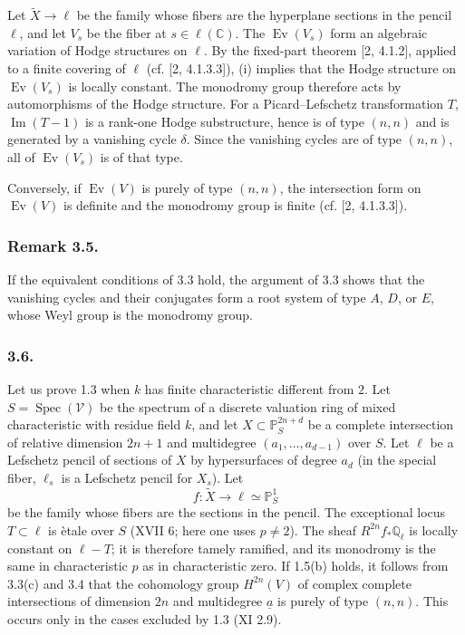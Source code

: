 Let $\widetilde X\to\ell$ be the family whose fibers are the hyperplane
sections in the pencil $\ell$, and let $V_s$ be the fiber at
$s\in\ell(\mathbb C)$.  The $\operatorname{Ev}(V_s)$ form an algebraic
variation of Hodge structures on $\ell$.  By the fixed-part theorem
[2, 4.1.2], applied to a finite covering of $\ell$ (cf. [2, 4.1.3.3]), (i)
implies that the Hodge structure on $\operatorname{Ev}(V_s)$ is locally
constant.  The monodromy group therefore acts by automorphisms of the Hodge
structure.  For a Picard--Lefschetz transformation $T$,
$\operatorname{Im}(T-1)$ is a rank-one Hodge substructure, hence is of type
$(n,n)$ and is generated by a vanishing cycle $\delta$.  Since the
vanishing cycles are of type $(n,n)$, all of
$\operatorname{Ev}(V_s)$ is of that type.

Conversely, if $\operatorname{Ev}(V)$ is purely of type $(n,n)$, the
intersection form on $\operatorname{Ev}(V)$ is definite and the monodromy
group is finite (cf. [2, 4.1.3.3]).

\subsubsection*{Remark 3.5.}
If the equivalent conditions of 3.3 hold, the argument of 3.3 shows that
the vanishing cycles and their conjugates form a root system of type $A$,
$D$, or $E$, whose Weyl group is the monodromy group.

\subsubsection*{3.6.}
Let us prove 1.3 when $k$ has finite characteristic different from $2$.
Let $S=\operatorname{Spec}(\mathcal V)$ be the spectrum of a discrete
valuation ring of mixed characteristic with residue field $k$, and let
$X\subset\mathbb P_S^{2n+d}$ be a complete intersection of relative
dimension $2n+1$ and multidegree $(a_1,\ldots,a_{d-1})$ over $S$.  Let
$\ell$ be a Lefschetz pencil of sections of $X$ by hypersurfaces of degree
$a_d$ (in the special fiber, $\ell_s$ is a Lefschetz pencil for $X_s$).
Let
\[
  f:\widetilde X\longrightarrow\ell\simeq\mathbb P^1_S
\]
be the family whose fibers are the sections in the pencil.  The exceptional
locus $T\subset\ell$ is \`etale over $S$ (XVII 6; here one uses
$p\ne2$).  The sheaf $R^{2n}f_*\mathbb Q_\ell$ is locally constant on
$\ell-T$; it is therefore tamely ramified, and its monodromy is the same in
characteristic $p$ as in characteristic zero.  If 1.5(b) holds, it follows
from 3.3(c) and 3.4 that the cohomology group $H^{2n}(V)$ of complex
complete intersections of dimension $2n$ and multidegree
$\underline a$ is purely of type $(n,n)$.  This occurs only in the cases
excluded by 1.3 (XI 2.9).

